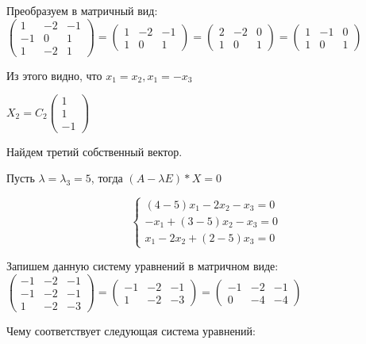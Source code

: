 \documentclass{article}
\begin{document}
Преобразуем в матричный вид: $\begin{pmatrix}
    1 & -2 & -1 \\
    -1 & 0 & 1 \\
    1 & -2 & 1
\end{pmatrix} = \begin{pmatrix}
    1 & -2 & -1 \\ 1 & 0 & 1
\end{pmatrix} = \begin{pmatrix}
    2 & -2 & 0 \\
    1 & 0 & 1
\end{pmatrix} = \begin{pmatrix}
    1 & -1 & 0 \\
    1 & 0 & 1
\end{pmatrix}$

Из этого видно, что $x_1 = x_2, x_1 = -x_3$

$X_2 = C_2 \begin{pmatrix}
    1 \\
    1 \\
    -1
\end{pmatrix}$

Найдем третий собственный вектор.

Пусть $\lambda = \lambda_3 = 5$, тогда $(A - \lambda E) * X = 0$

\begin{equation}
    \begin{cases}
        (4 - 5)x_1 - 2x_2 - x_3 = 0 \\
        -x_1 + (3 - 5)x_2 - x_3 = 0 \\
        x_1 - 2x_2 + (2 - 5)x_3 = 0
    \end{cases}
\end{equation}

Запишем данную систему уравнений в матричном виде: $\begin{pmatrix}
    -1 & -2 & -1 \\
    -1 & -2 & -1 \\
    1 & -2 & -3
\end{pmatrix} = \begin{pmatrix}
    -1 & -2 & -1 \\
    1 & -2 & -3
\end{pmatrix} = \begin{pmatrix}
    -1 & -2 & -1 \\
    0 & -4 & -4
\end{pmatrix}$

Чему соответствует следующая система уравнений:
\end{document}
